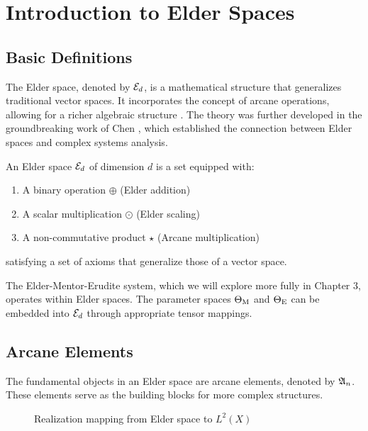 \chapter{Introduction to Elder Spaces}

\section{Basic Definitions}

The Elder space, denoted by $\mathcal{E}_{d}$, is a mathematical structure that generalizes traditional vector spaces. It incorporates the concept of arcane operations, allowing for a richer algebraic structure \cite{elder1995foundations}. The theory was further developed in the groundbreaking work of Chen \cite{chen2005realization}, which established the connection between Elder spaces and complex systems analysis.

\begin{definition}
An Elder space $\mathcal{E}_{d}$ of dimension $d$ is a set equipped with:
\begin{enumerate}
    \item A binary operation $\oplus$ (Elder addition)
    \item A scalar multiplication $\odot$ (Elder scaling)
    \item A non-commutative product $\star$ (Arcane multiplication)
\end{enumerate}
satisfying a set of axioms that generalize those of a vector space.
\end{definition}

\begin{remark}
The Elder-Mentor-Erudite system, which we will explore more fully in Chapter 3, operates within Elder spaces. The parameter spaces $\Theta_{\text{M}}$ and $\Theta_{\text{E}}$ can be embedded into $\mathcal{E}_{d}$ through appropriate tensor mappings.
\end{remark}

\section{Arcane Elements}

The fundamental objects in an Elder space are arcane elements, denoted by $\mathfrak{A}_{n}$. These elements serve as the building blocks for more complex structures.

\begin{figure}[htbp]
\centering
{}
\caption{Realization mapping from Elder space to $L^2(X)$}
\label{fig:realization-mapping}
\end{figure}

